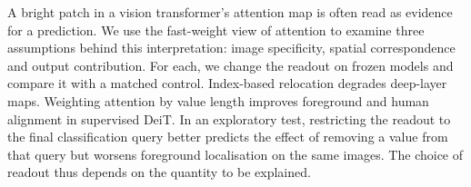A bright patch in a vision transformer's attention map is often read as evidence for a prediction. We use the fast-weight view of attention to examine three assumptions behind this interpretation: image specificity, spatial correspondence and output contribution. For each, we change the readout on frozen models and compare it with a matched control. Index-based relocation degrades deep-layer maps. Weighting attention by value length improves foreground and human alignment in supervised DeiT. In an exploratory test, restricting the readout to the final classification query better predicts the effect of removing a value from that query but worsens foreground localisation on the same images. The choice of readout thus depends on the quantity to be explained.
